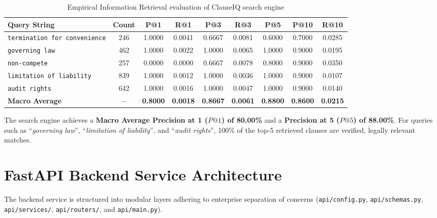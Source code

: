 \begin{table}[h!]
\centering
\small
\begin{tabular}{lcccccccc}
\toprule
\textbf{Query String} & \textbf{Count} & \textbf{P@1} & \textbf{R@1} & \textbf{P@3} & \textbf{R@3} & \textbf{P@5} & \textbf{P@10} & \textbf{R@10} \\
\midrule
\texttt{termination for convenience} & 246 & 1.0000 & 0.0041 & 0.6667 & 0.0081 & 0.6000 & 0.7000 & 0.0285 \\
\texttt{governing law}               & 462 & 1.0000 & 0.0022 & 1.0000 & 0.0065 & 1.0000 & 0.9000 & 0.0195 \\
\texttt{non-compete}                 & 257 & 0.0000 & 0.0000 & 0.6667 & 0.0078 & 0.8000 & 0.9000 & 0.0350 \\
\texttt{limitation of liability}     & 839 & 1.0000 & 0.0012 & 1.0000 & 0.0036 & 1.0000 & 0.9000 & 0.0107 \\
\texttt{audit rights}                & 642 & 1.0000 & 0.0016 & 1.0000 & 0.0047 & 1.0000 & 0.9000 & 0.0140 \\
\midrule
\textbf{Macro Average}               & \textbf{--} & \textbf{0.8000} & \textbf{0.0018} & \textbf{0.8667} & \textbf{0.0061} & \textbf{0.8800} & \textbf{0.8600} & \textbf{0.0215} \\
\bottomrule
\end{tabular}
\caption{Empirical Information Retrieval evaluation of ClauseIQ search engine}
\label{tab:search_evaluation}
\end{table}

The search engine achieves a \textbf{Macro Average Precision at 1 ($P@1$) of 80.00\%} and a \textbf{Precision at 5 ($P@5$) of 88.00\%}. For queries such as ``\textit{governing law}'', ``\textit{limitation of liability}'', and ``\textit{audit rights}'', 100\% of the top-5 retrieved clauses are verified, legally relevant matches.

\section{FastAPI Backend Service Architecture}
\label{sec:fastapi_backend}

The backend service is structured into modular layers adhering to enterprise separation of concerns (\texttt{api/config.py}, \texttt{api/schemas.py}, \texttt{api/services/}, \texttt{api/routers/}, and \texttt{api/main.py}).

